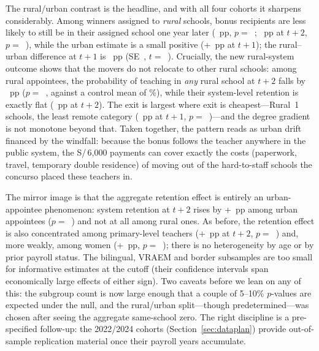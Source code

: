 \documentclass[11pt]{article}
\begin{document}
The rural/urban contrast is the headline, and with all four cohorts it
sharpens considerably. Among winners assigned to \emph{rural} schools, bonus
recipients are less likely to still be in their assigned school one year
later (\RuralSameschRF~pp, $p=$~\RuralSameschP; \RuralSameschTwoRF~pp at
$t+2$, $p=$~\RuralSameschTwoP), while the urban estimate is a small positive
(+\UrbanSameschRF~pp at $t+1$); the rural--urban difference at $t+1$ is
\RuralUrbanDiff~pp (SE~\RuralUrbanDiffSE, $t=$~\RuralUrbanDiffT). Crucially,
the new rural-system outcome shows that the movers do not relocate to other
rural schools: among rural appointees, the probability of teaching in
\emph{any} rural school at $t+2$ falls by \InruralRuralRF~pp
($p=$~\InruralRuralP, against a control mean of \InruralRuralMean\%), while
their system-level retention is exactly flat (\RuralRetainTwoRF~pp at
$t+2$). The exit is largest where exit is cheapest---Rural~1 schools, the
least remote category (\RuralOneSameschRF~pp at $t+1$,
$p=$~\RuralOneSameschP)---and the degree gradient is not monotone beyond
that. Taken together, the pattern reads as urban drift financed by the
windfall: because the bonus follows the teacher anywhere in the public
system, the S/\,6,000 payments can cover exactly the costs (paperwork,
travel, temporary double residence) of moving out of the hard-to-staff
schools the concurso placed these teachers in.

The mirror image is that the aggregate retention effect is entirely an
urban-appointee phenomenon: system retention at $t+2$ rises by
+\UrbanRetainRF~pp among urban appointees ($p=$~\UrbanRetainP) and not at
all among rural ones. As before, the retention effect is also concentrated
among primary-level teachers (+\PrimRetainRF~pp at $t+2$, $p=$~\PrimRetainP)
and, more weakly, among women (+\FemRetainRF~pp, $p=$~\FemRetainP); there is
no heterogeneity by age or by prior payroll status. The bilingual, VRAEM and
border subsamples are too small for informative estimates at the cutoff
(their confidence intervals span economically large effects of either sign).
Two caveats before we lean on any of this: the subgroup count is now large
enough that a couple of 5--10\% $p$-values are expected under the null, and
the rural/urban split---though predetermined---was chosen after seeing the
aggregate same-school zero. The right discipline is a pre-specified
follow-up: the 2022/2024 cohorts (Section~\ref{sec:dataplan}) provide
out-of-sample replication material once their payroll years accumulate.
\end{document}
